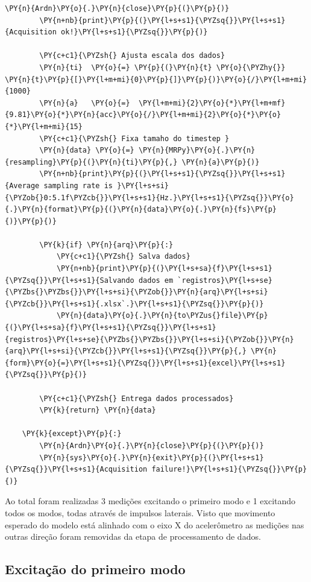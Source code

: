 \begin{tcolorbox}[breakable, size=fbox, boxrule=1pt, pad at break*=1mm,colback=cellbackground, colframe=cellborder]
\begin{Verbatim}[commandchars=\\\{\}]
        \PY{n}{Ardn}\PY{o}{.}\PY{n}{close}\PY{p}{(}\PY{p}{)}
        \PY{n+nb}{print}\PY{p}{(}\PY{l+s+s1}{\PYZsq{}}\PY{l+s+s1}{Acquisition ok!}\PY{l+s+s1}{\PYZsq{}}\PY{p}{)}

        \PY{c+c1}{\PYZsh{} Ajusta escala dos dados}
        \PY{n}{ti}  \PY{o}{=} \PY{p}{(}\PY{n}{t} \PY{o}{\PYZhy{}} \PY{n}{t}\PY{p}{[}\PY{l+m+mi}{0}\PY{p}{]}\PY{p}{)}\PY{o}{/}\PY{l+m+mi}{1000}
        \PY{n}{a}   \PY{o}{=}  \PY{l+m+mi}{2}\PY{o}{*}\PY{l+m+mf}{9.81}\PY{o}{*}\PY{n}{acc}\PY{o}{/}\PY{l+m+mi}{2}\PY{o}{*}\PY{o}{*}\PY{l+m+mi}{15}
        \PY{c+c1}{\PYZsh{} Fixa tamaho do timestep }
        \PY{n}{data} \PY{o}{=} \PY{n}{MRPy}\PY{o}{.}\PY{n}{resampling}\PY{p}{(}\PY{n}{ti}\PY{p}{,} \PY{n}{a}\PY{p}{)}
        \PY{n+nb}{print}\PY{p}{(}\PY{l+s+s1}{\PYZsq{}}\PY{l+s+s1}{Average sampling rate is }\PY{l+s+si}{\PYZob{}0:5.1f\PYZcb{}}\PY{l+s+s1}{Hz.}\PY{l+s+s1}{\PYZsq{}}\PY{o}{.}\PY{n}{format}\PY{p}{(}\PY{n}{data}\PY{o}{.}\PY{n}{fs}\PY{p}{)}\PY{p}{)}

        \PY{k}{if} \PY{n}{arq}\PY{p}{:}
            \PY{c+c1}{\PYZsh{} Salva dados}
            \PY{n+nb}{print}\PY{p}{(}\PY{l+s+sa}{f}\PY{l+s+s1}{\PYZsq{}}\PY{l+s+s1}{Salvando dados em `registros}\PY{l+s+se}{\PYZbs{}\PYZbs{}}\PY{l+s+si}{\PYZob{}}\PY{n}{arq}\PY{l+s+si}{\PYZcb{}}\PY{l+s+s1}{.xlsx`.}\PY{l+s+s1}{\PYZsq{}}\PY{p}{)}
            \PY{n}{data}\PY{o}{.}\PY{n}{to\PYZus{}file}\PY{p}{(}\PY{l+s+sa}{f}\PY{l+s+s1}{\PYZsq{}}\PY{l+s+s1}{registros}\PY{l+s+se}{\PYZbs{}\PYZbs{}}\PY{l+s+si}{\PYZob{}}\PY{n}{arq}\PY{l+s+si}{\PYZcb{}}\PY{l+s+s1}{\PYZsq{}}\PY{p}{,} \PY{n}{form}\PY{o}{=}\PY{l+s+s1}{\PYZsq{}}\PY{l+s+s1}{excel}\PY{l+s+s1}{\PYZsq{}}\PY{p}{)}

        \PY{c+c1}{\PYZsh{} Entrega dados processados}
        \PY{k}{return} \PY{n}{data}
        
    \PY{k}{except}\PY{p}{:}
        \PY{n}{Ardn}\PY{o}{.}\PY{n}{close}\PY{p}{(}\PY{p}{)}
        \PY{n}{sys}\PY{o}{.}\PY{n}{exit}\PY{p}{(}\PY{l+s+s1}{\PYZsq{}}\PY{l+s+s1}{Acquisition failure!}\PY{l+s+s1}{\PYZsq{}}\PY{p}{)}
\end{Verbatim}
\end{tcolorbox}

    Ao total foram realizadas 3 medições excitando o primeiro modo e 1
excitando todos os modos, todas através de impulsos laterais. Visto que
movimento esperado do modelo está alinhado com o eixo X do acelerômetro
as medições nas outras direção foram removidas da etapa de processamento
de dados.

    \hypertarget{excitauxe7uxe3o-do-primeiro-modo}{%
\subsection{Excitação do primeiro
modo}\label{excitauxe7uxe3o-do-primeiro-modo}}

